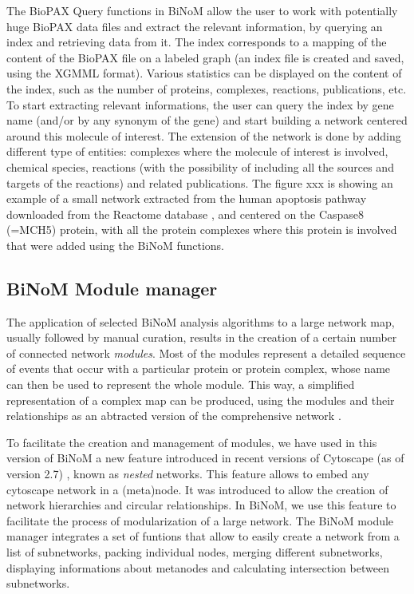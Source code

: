 \documentclass[10pt]{bmc_article}
\newenvironment{bmcformat}{\baselineskip20pt\sloppy\setboolean{publ}{false}}{\baselineskip20pt\sloppy}
\begin{document}
\begin{bmcformat}
The BioPAX Query functions in BiNoM allow the user to work with potentially huge
BioPAX data files and extract the relevant information, by querying an index and
retrieving data from it. The index corresponds to a mapping of the content of
the BioPAX file on a labeled graph (an index file is created and saved, using
the XGMML format). Various statistics can be displayed on the content of the
index, such as the number of proteins, complexes, reactions, publications, etc.
To start extracting relevant informations, the user can query the index by gene
name (and/or by any synonym of the gene) and start building a network centered
around this molecule of interest. The extension of the network is done by adding
different type of entities: complexes where the molecule of interest is
involved, chemical species, reactions (with the possibility of including all the
sources and targets of the reactions) and related publications. The figure xxx
is showing an example of a small network extracted from the human apoptosis
pathway downloaded from the Reactome database \cite{joshi2005reactome}, and
centered on the Caspase8 (=MCH5) protein, with all the protein complexes where
this protein is involved that were added using the BiNoM functions.


\subsection*{BiNoM Module manager}
The application of selected BiNoM analysis algorithms to a large network map,
usually followed by manual curation, results in the creation of a certain number
of connected network \emph{modules}. Most of the modules represent a detailed
sequence of events that occur with a particular protein or protein complex,
whose name can then be used to represent the whole module. This way, a
simplified representation of a complex map can be produced, using the modules
and their relationships as an abtracted version of the comprehensive network
\cite{calzone2008comprehensive}.

To facilitate the creation and management of modules, we have used in this
version of BiNoM a new feature introduced in recent versions of Cytoscape (as of
version 2.7) \cite{cline2007integration}, known as \emph{nested} networks. This
feature allows to embed any cytoscape network in a (meta)node. It was
introduced to allow the creation of network hierarchies and circular
relationships. In BiNoM, we use this feature to facilitate the process of
modularization of a large network. The BiNoM module manager integrates a set of
funtions that allow to easily create a network from a list of subnetworks,
packing individual nodes, merging different subnetworks, displaying informations
about metanodes and calculating intersection between subnetworks.


\end{bmcformat}
\end{document}
